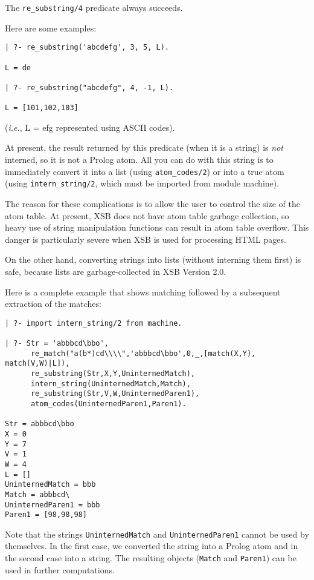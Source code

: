 The \verb|re_substring/4| predicate always succeeds.

Here are some examples: 
\begin{verbatim}
| ?- re_substring('abcdefg', 3, 5, L).

L = de

| ?- re_substring("abcdefg", 4, -1, L).

L = [101,102,103]
\end{verbatim}
({\it i.e.}, L = efg represented using ASCII codes).

At present, the result returned by this predicate (when it is a string) is
\emph{not} interned, so it is not a Prolog atom.  All you can do with this
string is to immediately convert it into a list (using {\tt atom\_codes/2})
or into a true atom (using {\tt intern\_string/2}, which must be imported
from module machine).

The reason for these complications is to allow the user to control the size
of the atom table. At present, XSB does not have atom table garbage
collection, so heavy use of string manipulation functions can result in
atom table overflow. This danger is particularly severe when XSB is used
for processing HTML pages.

On the other hand, converting strings into lists (without interning them
first) is safe, because lists are garbage-collected in XSB Version 2.0.

Here is a complete example that shows matching followed by a subsequent 
extraction of the matches:
\begin{verbatim}
| ?- import intern_string/2 from machine.

| ?- Str = 'abbbcd\bbo',
      re_match("a(b*)cd\\\\",'abbbcd\bbo',0,_,[match(X,Y), match(V,W)|L]),
      re_substring(Str,X,Y,UninternedMatch),
      intern_string(UninternedMatch,Match),
      re_substring(Str,V,W,UninternedParen1),
      atom_codes(UninternedParen1,Paren1).

Str = abbbcd\bbo
X = 0
Y = 7
V = 1
W = 4
L = []
UninternedMatch = bbb
Match = abbbcd\
UninternedParen1 = bbb
Paren1 = [98,98,98]
\end{verbatim}
Note that the strings {\tt UninternedMatch} and {\tt UninternedParen1}
cannot be used by themselves. In the first case, we converted the string
into a Prolog atom and in the second case into a string. The resulting
objects ({\tt Match} and {\tt Paren1}) can be used in further computations.

